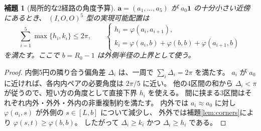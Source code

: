 \documentclass[11pt,a4paper]{article}
\theoremstyle{JPthm}
\newtheorem{lemma}[theorem]{補題}
\theoremstyle{definition}
\newcommand{\Rc}{R_{0}}
\newcommand{\ph}{\varphi}
\newcommand{\one}{\mathbf 1}
\begin{document}
\begin{lemma}[局所的な2経路の角度予算]\label{lem:two-path}
$\boldsymbol a=(a_1,\ldots,a_5)$ が $a_0\one$ の十分小さい近傍にあるとき、
$(I,O,O)^5$ 型の実現可能配置は
\begin{equation}\label{eq:local-budget}
\sum_{i=1}^{5}\max\{h_i,k_i\}\le 2\pi,
\qquad\begin{cases}
h_i=\ph(a_i,a_{i+1}),\\
k_i=\ph(a_i,b)+\ph(b,b)+\ph(a_{i+1},b)
\end{cases}
\end{equation}
を満たす。ここで $b=\Rc-1$ は外側半径の\emph{上界}として使う。
\end{lemma}
\begin{proof}
内側5円の隣り合う偏角差 $\Delta_i$ は、一周で $\sum_i\Delta_i=2\pi$ を満たす。
$a_i$ が $a_0$ に近ければ、各内内ペアの必要角度は $2\pi/5$ に近い。
他の4区間の和から $\Delta_i<\pi$ が従うので、短い方の角度として直接下界 $h_i$ を使える。
間に挟まる3区間はそれぞれ内外・外外・外内の非重複制約を満たす。
内外では $a_i\approx a_0$ に対し $\ph(a_i,s)$ が外側の $s\in[L,b]$ について減少し、
外外では補題\ref{lem:corners}により $\ph(s,t)\ge\ph(b,b)$。
したがって $\Delta_i\ge k_i$ かつ $\Delta_i\ge h_i$ である。
\end{proof}
\end{document}

